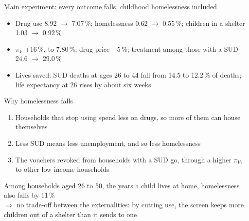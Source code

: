 \documentclass[aspectratio=169,11pt]{beamer}
\newcommand{\HF}{Housing First}
\newcommand{\TF}{Treatment First}
\newcommand{\pc}{\,\%}
\begin{document}
\begin{frame}{Main experiment: every outcome falls, childhood homelessness included}
\centering
{}
\raggedright\small
\begin{itemize}
\item Drug use 8.92 $\to$ 7.07\pc; homelessness 0.62 $\to$ 0.55\pc; children in a shelter 1.03 $\to$ 0.92\pc
\item $\pi_V$ +16\pc, to 7.80\pc; drug price $-$5\pc; treatment among those with a SUD 24.6 $\to$ 29.0\pc
\item Lives saved: SUD deaths at ages 26 to 44 fall from 14.5 to 12.2\pc{} of deaths; life expectancy at 26 rises by about six weeks
\end{itemize}
\end{frame}

\begin{frame}{Why homelessness falls}
\begin{enumerate}\setlength\itemsep{0.6em}
\item Households that stop using spend less on drugs, so more of them can house themselves
\item Less SUD means less unemployment, and so less homelessness
\item The vouchers revoked from households with a SUD go, through a higher $\pi_V$, to other low-income households
\end{enumerate}
\vspace{0.4cm}
Among households aged 26 to 50, the years a child lives at home, homelessness also falls by 11\pc{}\\[0.3em]
$\Rightarrow$ no trade-off between the externalities: by cutting use, the screen keeps more children out of a shelter than it sends to one
\end{frame}
\end{document}
